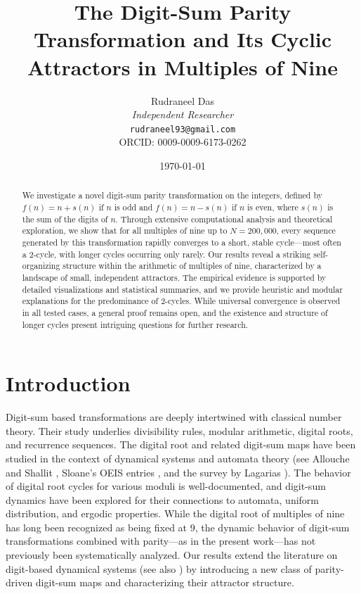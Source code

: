 \documentclass[12pt]{article}
\title{The Digit-Sum Parity Transformation and Its Cyclic Attractors in Multiples of Nine}
\author{Rudraneel Das \\
\textit{Independent Researcher} \\
\texttt{rudraneel93@gmail.com} \\
ORCID: 0009-0009-6173-0262
}
\date{\today}
\begin{document}
\maketitle

\begin{abstract}
We investigate a novel digit-sum parity transformation on the integers, defined by $f(n) = n + s(n)$ if $n$ is odd and $f(n) = n - s(n)$ if $n$ is even, where $s(n)$ is the sum of the digits of $n$. Through extensive computational analysis and theoretical exploration, we show that for all multiples of nine up to $N=200,000$, every sequence generated by this transformation rapidly converges to a short, stable cycle—most often a 2-cycle, with longer cycles occurring only rarely. Our results reveal a striking self-organizing structure within the arithmetic of multiples of nine, characterized by a landscape of small, independent attractors. The empirical evidence is supported by detailed visualizations and statistical summaries, and we provide heuristic and modular explanations for the predominance of 2-cycles. While universal convergence is observed in all tested cases, a general proof remains open, and the existence and structure of longer cycles present intriguing questions for further research.
\end{abstract}

\section{Introduction}

Digit-sum based transformations are deeply intertwined with classical number theory. Their study underlies divisibility rules, modular arithmetic, digital roots, and recurrence sequences. The digital root and related digit-sum maps have been studied in the context of dynamical systems and automata theory (see Allouche and Shallit \cite{alloucheshallit}, Sloane's OEIS entries \cite{oeisA010888,oeisA007953}, and the survey by Lagarias \cite{lagarias}). The behavior of digital root cycles for various moduli is well-documented, and digit-sum dynamics have been explored for their connections to automata, uniform distribution, and ergodic properties. While the digital root of multiples of nine has long been recognized as being fixed at 9, the dynamic behavior of digit-sum transformations combined with parity---as in the present work---has not previously been systematically analyzed. Our results extend the literature on digit-based dynamical systems (see also \cite{goksel2022, rowland2010, rowland2011}) by introducing a new class of parity-driven digit-sum maps and characterizing their attractor structure.
\end{document}
